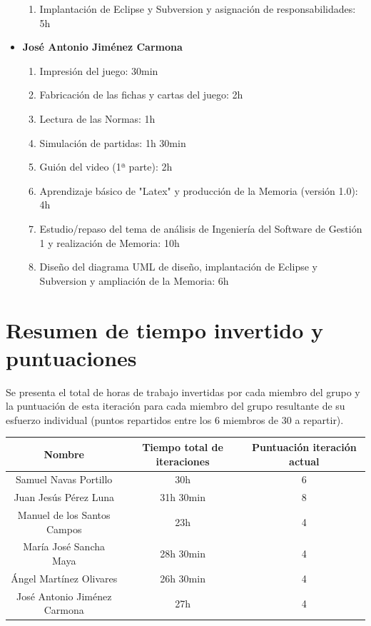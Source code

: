 \documentclass[11 pt]{book}
\begin{document}
\begin{itemize}
\begin{enumerate}
					\item Implantación de Eclipse y Subversion y asignación de responsabilidades: 5h
				\end{enumerate}
			\item \textbf {José Antonio Jiménez Carmona}
				\begin{enumerate}
					\item Impresión del juego: 30min
					\item Fabricación de las fichas y cartas del juego: 2h
					\item Lectura de las Normas: 1h
					\item Simulación de partidas: 1h 30min
					\item Guión del video (1ª parte): 2h
					\item Aprendizaje básico de "Latex" y producción de la Memoria (versión 1.0): 4h
					\item Estudio/repaso del tema de análisis de Ingeniería del Software de Gestión 1 y realización de Memoria: 10h
					\item Diseño del diagrama UML de diseño, implantación de Eclipse y Subversion y ampliación de la Memoria: 6h
				\end{enumerate}
		\end{itemize}

	\section*{Resumen de tiempo invertido y puntuaciones}
		Se presenta el total de horas de trabajo invertidas por cada miembro del grupo y la puntuación de esta iteración para cada miembro del grupo resultante de su esfuerzo individual (puntos repartidos entre los 6 miembros de 30 a repartir).\\
			
		\begin{tabular}{|c|c|c|}
			\hline
			Nombre & Tiempo total de iteraciones & Puntuación iteración actual\\
			\hline
			Samuel Navas Portillo & 30h & 6\\
			Juan Jesús Pérez Luna & 31h 30min & 8\\
			Manuel de los Santos Campos & 23h & 4\\
			María José Sancha Maya & 28h 30min & 4\\
			Ángel Martínez Olivares & 26h 30min & 4\\
			José Antonio Jiménez Carmona & 27h & 4\\
			\hline
		\end{tabular}
\end{document}
